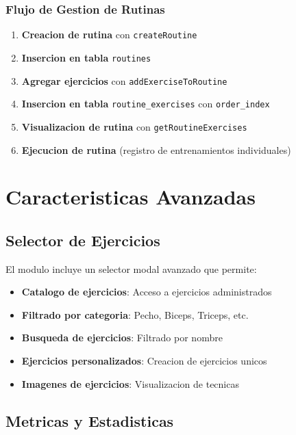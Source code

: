 \documentclass[12pt,a4paper]{article}
\begin{document}
\subsubsection{Flujo de Gestion de Rutinas}

\begin{enumerate}
    \item \textbf{Creacion de rutina} con \texttt{createRoutine}
    \item \textbf{Insercion en tabla} \texttt{routines}
    \item \textbf{Agregar ejercicios} con \texttt{addExerciseToRoutine}
    \item \textbf{Insercion en tabla} \texttt{routine\_exercises} con \texttt{order\_index}
    \item \textbf{Visualizacion de rutina} con \texttt{getRoutineExercises}
    \item \textbf{Ejecucion de rutina} (registro de entrenamientos individuales)
\end{enumerate}

\section{Caracteristicas Avanzadas}

\subsection{Selector de Ejercicios}

El modulo incluye un selector modal avanzado que permite:

\begin{itemize}
    \item \textbf{Catalogo de ejercicios}: Acceso a ejercicios administrados
    \item \textbf{Filtrado por categoria}: Pecho, Biceps, Triceps, etc.
    \item \textbf{Busqueda de ejercicios}: Filtrado por nombre
    \item \textbf{Ejercicios personalizados}: Creacion de ejercicios unicos
    \item \textbf{Imagenes de ejercicios}: Visualizacion de tecnicas
\end{itemize}

\subsection{Metricas y Estadisticas}
\end{document}
